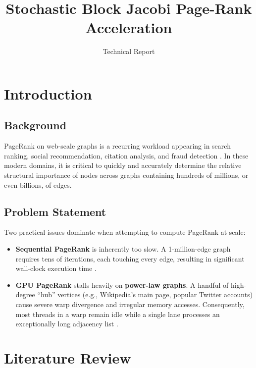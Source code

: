 \documentclass[12pt,a4paper]{article}
\title{\textbf{Stochastic Block Jacobi Page-Rank Acceleration}}
\author{Technical Report}
\date{}
\begin{document}
	\renewcommand*\contentsname{Table of Contents}
	\tableofcontents
	\newpage
    \listoffigures
    \newpage
    \listoftables
    \newpage
   
    \section{Introduction}

	\subsection{Background}
	PageRank on web-scale graphs is a recurring workload appearing in search ranking, social recommendation, citation analysis, and fraud detection \cite{page1999pagerank}. In these modern domains, it is critical to quickly and accurately determine the relative structural importance of nodes across graphs containing hundreds of millions, or even billions, of edges.
	
	\subsection{Problem Statement}
	Two practical issues dominate when attempting to compute PageRank at scale:
    \begin{itemize}
        \item \textbf{Sequential PageRank} is inherently too slow. A 1-million-edge graph requires tens of iterations, each touching every edge, resulting in significant wall-clock execution time \cite{gleich2004parallel}.
        \item \textbf{GPU PageRank} stalls heavily on \textbf{power-law graphs}. A handful of high-degree ``hub'' vertices (e.g., Wikipedia's main page, popular Twitter accounts) cause severe warp divergence and irregular memory accesses. Consequently, most threads in a warp remain idle while a single lane processes an exceptionally long adjacency list \cite{bell2009implementing}.
    \end{itemize}

	\newpage
	\section{Literature Review}
	
\end{document}

